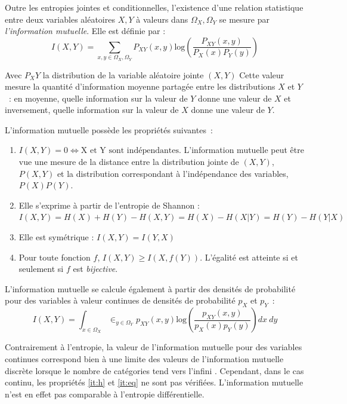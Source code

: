 \documentclass[../main]{subfiles}
\begin{document}
Outre les entropies jointes et conditionnelles, l'existence d'une relation statistique entre deux variables aléatoires $X,Y$ à valeurs dans $\Omega_X,\Omega_Y$ se mesure par \emph{l'information mutuelle}.
Elle est définie par : 
\begin{equation}
 I(X,Y) = \sum_{x,y \in \Omega_X,\Omega_Y}{P_{XY}(x,y)\textrm{log}(\frac{P_{XY}(x,y)}{P_X(x)P_Y(y)})}
\end{equation}

Avec $P_XY$ la distribution de la variable aléatoire jointe $(X,Y)$
Cette valeur mesure la quantité d'information moyenne partagée entre les distributions $X$ et $Y$~: en moyenne, quelle information sur la valeur de $Y$ donne une valeur de $X$ et inversement, quelle information sur la valeur de $X$ donne une valeur de $Y$.

L'information mutuelle possède les propriétés suivantes~:
\begin{enumerate}
\item $I(X,Y) = 0 \Leftrightarrow \textrm{X et Y sont indépendantes}$. L'information mutuelle peut être vue une mesure de la distance entre la distribution jointe de $(X,Y)$, $P(X,Y)$ et la distribution correspondant à l'indépendance des variables, $P(X)P(Y)$.
\item\label{it:h} Elle s'exprime à partir de l'entropie de Shannon : $I(X,Y) = H(X) + H(Y) - H(X,Y) = H(X) - H(X|Y) = H(Y) - H(Y|X)$
\item Elle est symétrique : $I(X,Y) = I(Y,X)$
\item\label{it:eq} Pour toute fonction $f$, $I(X,Y) \geq I(X,f(Y))$. L'égalité est atteinte si et seulement si $f$ est \emph{bijective}.
\end{enumerate}

L'information mutuelle se calcule également à partir des densités de probabilité pour des variables à valeur continues de densités de probabilité $p_X$ et $p_Y$~:
\begin{equation}
    I(X,Y) = \int_{x \in \Omega_X}\in _ {y \in \Omega_Y }{p_{XY}(x,y)\textrm{log}(\frac{p_{XY}(x,y)}{p_X(x)p_Y(y)})dx \: dy}
\end{equation}

Contrairement à l'entropie, la valeur de l'information mutuelle pour des variables continues correspond bien à une limite des valeurs de l'information mutuelle discrète lorsque le nombre de catégories tend vers l'infini \cite{Cover2005ElementsOI}.
Cependant, dans le cas continu, les propriétés \ref{it:h} et \ref{it:eq} ne sont pas vérifiées. L'information mutuelle n'est en effet pas comparable à l'entropie différentielle.
\end{document}
